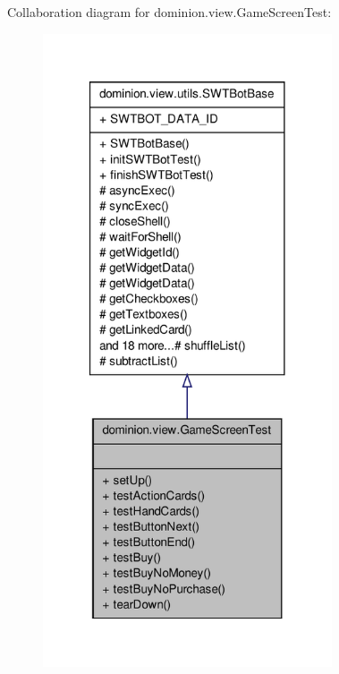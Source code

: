 \-Collaboration diagram for dominion.\-view.\-Game\-Screen\-Test\-:
\nopagebreak
\begin{figure}[H]
\begin{center}
\leavevmode
\includegraphics[width=242pt]{classdominion_1_1view_1_1GameScreenTest__coll__graph}
\end{center}
\end{figure}
